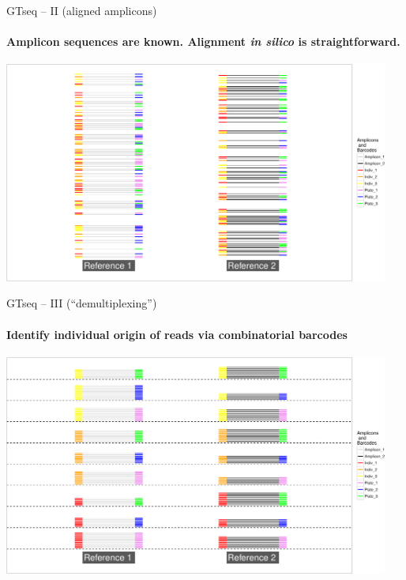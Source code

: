 \documentclass[letter,graphicx]{beamer}
\begin{document}
\begin{frame}{GTseq -- II (aligned amplicons)}
\framesubtitle{Amplicon sequences are known. Alignment {\em in silico} is straightforward.}
\begin{center}
\includegraphics[width=0.95\textwidth]{figs/gtseq-amps-crop.pdf}
\end{center}
\end{frame}



\begin{frame}{GTseq -- III (``demultiplexing'')}
\framesubtitle{Identify individual origin of reads via combinatorial barcodes}
\begin{center}
\includegraphics[width=0.95\textwidth]{figs/gtseq-demultiplexed-crop.pdf}
\end{center}
\end{frame}
\end{document}
